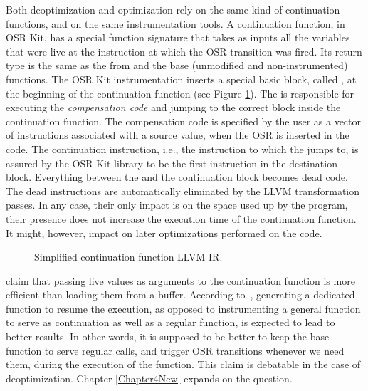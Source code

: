 Both deoptimization and optimization rely on the same kind of continuation functions, and on the same instrumentation tools.
A continuation function, in OSR Kit, has a special function signature that takes as inputs all the variables that were live at the instruction at which the OSR transition was fired.
Its return type is the same as the from and the base (unmodified and non-instrumented) functions.
The OSR Kit instrumentation inserts a special basic block, called , at the beginning of the continuation function (see Figure \ref{fig:simplifiedcontinuationir}).
The  is responsible for executing the \textit{compensation code} and jumping to the correct block inside the continuation function.
The compensation code is specified by the user as a vector of instructions associated with a source value, when the OSR is inserted in the code.
The continuation instruction, i.e., the instruction to which the  jumps to, is assured by the OSR Kit library to be the first instruction in the destination block.
Everything between the  and the continuation block becomes dead code.
The dead instructions are automatically eliminated by the LLVM transformation passes.
In any case, their only impact is on the space used up by the program, their presence does not increase the execution time of the continuation function.
It might, however, impact on later optimizations performed on the code.\\

\begin{figure}[h]
\caption{Simplified continuation function LLVM IR.}
\label{fig:simplifiedcontinuationir}
\end{figure}

 claim that passing live values as arguments to the continuation function is more efficient than loading them from a buffer.
According to~\cite{fink2003design}, generating a dedicated function to resume the execution, as opposed to instrumenting a general function to serve as continuation as well as a regular function, is expected to lead to better results.
In other words, it is supposed to be better to keep the base function to serve regular calls, and trigger OSR transitions whenever we need them, during the execution of the function.
This claim is debatable in the case of deoptimization.
Chapter \ref{Chapter4New} expands on the question.\\

